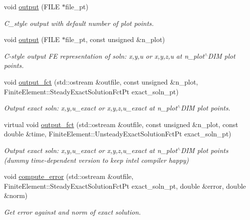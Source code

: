 \begin{DoxyCompactItemize}
void \hyperlink{classoomph_1_1MyBiharmonicEquations_a2ee8f210f50cf3b43f2b31b5e16b704f}{output} (F\+I\+LE $\ast$file\+\_\+pt)
\begin{DoxyCompactList}\small\item\em C\+\_\+style output with default number of plot points. \end{DoxyCompactList}\item 
void \hyperlink{classoomph_1_1MyBiharmonicEquations_a898e272a1af66eacb3ebe5ac2fbe7749}{output} (F\+I\+LE $\ast$file\+\_\+pt, const unsigned \&n\+\_\+plot)
\begin{DoxyCompactList}\small\item\em C-\/style output FE representation of soln\+: x,y,u or x,y,z,u at n\+\_\+plot$^\wedge$\+D\+IM plot points. \end{DoxyCompactList}\item 
void \hyperlink{classoomph_1_1MyBiharmonicEquations_a0f45f28eae4d25ddd9e53a769c3626a3}{output\+\_\+fct} (std\+::ostream \&outfile, const unsigned \&n\+\_\+plot, Finite\+Element\+::\+Steady\+Exact\+Solution\+Fct\+Pt exact\+\_\+soln\+\_\+pt)
\begin{DoxyCompactList}\small\item\em Output exact soln\+: x,y,u\+\_\+exact or x,y,z,u\+\_\+exact at n\+\_\+plot$^\wedge$\+D\+IM plot points. \end{DoxyCompactList}\item 
virtual void \hyperlink{classoomph_1_1MyBiharmonicEquations_a95b35b18fac5212ade1a81c26657bcdb}{output\+\_\+fct} (std\+::ostream \&outfile, const unsigned \&n\+\_\+plot, const double \&time, Finite\+Element\+::\+Unsteady\+Exact\+Solution\+Fct\+Pt exact\+\_\+soln\+\_\+pt)
\begin{DoxyCompactList}\small\item\em Output exact soln\+: x,y,u\+\_\+exact or x,y,z,u\+\_\+exact at n\+\_\+plot$^\wedge$\+D\+IM plot points (dummy time-\/dependent version to keep intel compiler happy) \end{DoxyCompactList}\item 
void \hyperlink{classoomph_1_1MyBiharmonicEquations_ac605d044c4e8c0483dcdf9b3b9e6634d}{compute\+\_\+error} (std\+::ostream \&outfile, Finite\+Element\+::\+Steady\+Exact\+Solution\+Fct\+Pt exact\+\_\+soln\+\_\+pt, double \&error, double \&norm)
\begin{DoxyCompactList}\small\item\em Get error against and norm of exact solution. \end{DoxyCompactList}\item 

\end{DoxyCompactItemize}
